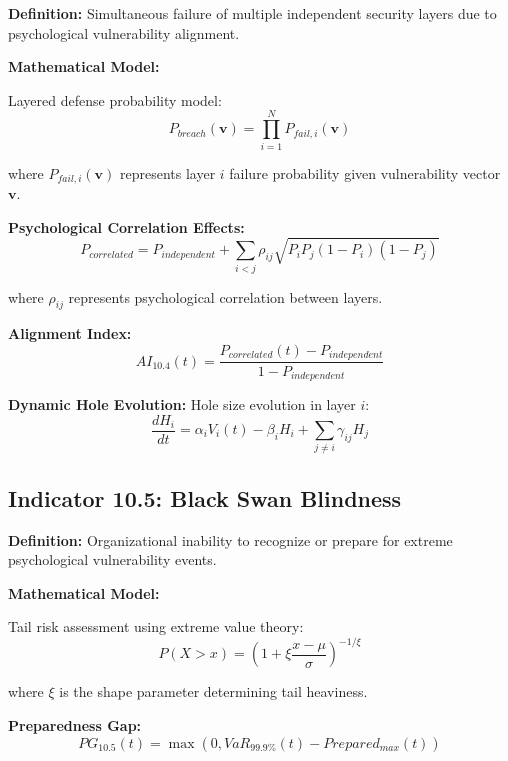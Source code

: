 \documentclass[11pt,a4paper]{article}
\begin{document}
\textbf{Definition:} Simultaneous failure of multiple independent security layers due to psychological vulnerability alignment.

\textbf{Mathematical Model:}

Layered defense probability model:
\begin{equation}
P_{breach}(\mathbf{v}) = \prod_{i=1}^{N} P_{fail,i}(\mathbf{v})
\end{equation}

where $P_{fail,i}(\mathbf{v})$ represents layer $i$ failure probability given vulnerability vector $\mathbf{v}$.

\textbf{Psychological Correlation Effects:}
\begin{equation}
P_{correlated} = P_{independent} + \sum_{i<j} \rho_{ij} \sqrt{P_i P_j (1-P_i)(1-P_j)}
\end{equation}

where $\rho_{ij}$ represents psychological correlation between layers.

\textbf{Alignment Index:}
\begin{equation}
AI_{10.4}(t) = \frac{P_{correlated}(t) - P_{independent}}{1 - P_{independent}}
\end{equation}

\textbf{Dynamic Hole Evolution:}
Hole size evolution in layer $i$:
\begin{equation}
\frac{dH_i}{dt} = \alpha_i V_i(t) - \beta_i H_i + \sum_{j \neq i} \gamma_{ij} H_j
\end{equation}

\subsection{Indicator 10.5: Black Swan Blindness}

\textbf{Definition:} Organizational inability to recognize or prepare for extreme psychological vulnerability events.

\textbf{Mathematical Model:}

Tail risk assessment using extreme value theory:
\begin{equation}
P(X > x) = \left(1 + \xi \frac{x - \mu}{\sigma}\right)^{-1/\xi}
\end{equation}

where $\xi$ is the shape parameter determining tail heaviness.

\textbf{Preparedness Gap:}
\begin{equation}
PG_{10.5}(t) = \max\left(0, VaR_{99.9\%}(t) - Prepared_{max}(t)\right)
\end{equation}
\end{document}
